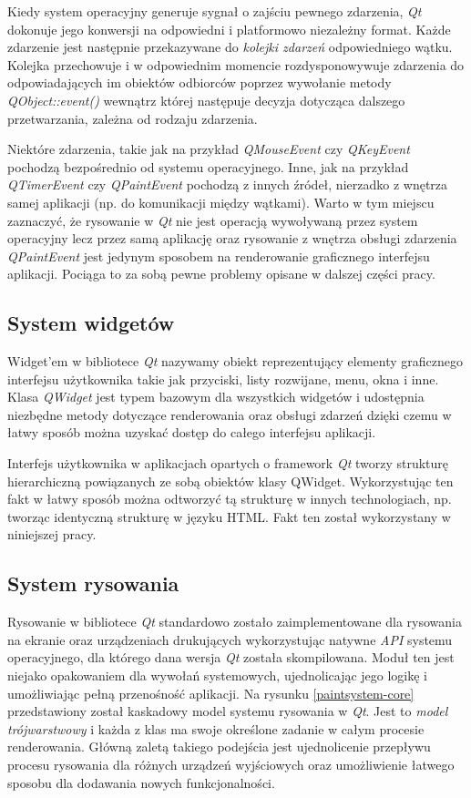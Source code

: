Kiedy system operacyjny generuje sygnał o zajściu pewnego zdarzenia, \emph{Qt} dokonuje jego konwersji na odpowiedni i platformowo niezależny format. Każde zdarzenie jest następnie przekazywane do \emph{kolejki zdarzeń} odpowiedniego wątku. Kolejka przechowuje i w odpowiednim momencie rozdysponowywuje zdarzenia do odpowiadających im obiektów odbiorców poprzez wywołanie metody \emph{QObject::event()} wewnątrz której następuje decyzja dotycząca dalszego przetwarzania, zależna od rodzaju zdarzenia. 

Niektóre zdarzenia, takie jak na przykład \emph{QMouseEvent} czy \emph{QKeyEvent} pochodzą bezpośrednio od systemu operacyjnego. Inne, jak na przykład \emph{QTimerEvent} czy \emph{QPaintEvent} pochodzą z innych źródeł, nierzadko z wnętrza samej aplikacji (np. do komunikacji między wątkami). Warto w tym miejscu zaznaczyć, że rysowanie w \emph{Qt} nie jest operacją wywoływaną przez system operacyjny lecz przez samą aplikację oraz rysowanie z wnętrza obsługi zdarzenia \emph{QPaintEvent} jest jedynym sposobem na renderowanie graficznego interfejsu aplikacji. Pociąga to za sobą pewne problemy opisane w dalszej części pracy.

\subsection{System widgetów}
Widget'em w bibliotece \emph{Qt} nazywamy obiekt reprezentujący elementy graficznego interfejsu użytkownika takie jak przyciski, listy rozwijane, menu, okna i inne. Klasa \emph{QWidget}\cite{qwidget} jest typem bazowym dla wszystkich widgetów i udostępnia niezbędne metody dotyczące renderowania oraz obsługi zdarzeń dzięki czemu w łatwy sposób można uzyskać dostęp do całego interfejsu aplikacji.

Interfejs użytkownika w aplikacjach opartych o framework \emph{Qt} tworzy strukturę hierarchiczną powiązanych ze sobą obiektów klasy QWidget. Wykorzystując ten fakt w łatwy sposób można odtworzyć tą strukturę w innych technologiach, np. tworząc identyczną strukturę w języku HTML. Fakt ten został wykorzystany w niniejszej pracy.

\subsection{System rysowania}
\label{system_rysowania}
Rysowanie w bibliotece \emph{Qt} standardowo zostało zaimplementowane dla rysowania na ekranie oraz urządzeniach drukujących wykorzystując natywne \emph{API} systemu operacyjnego, dla którego dana wersja \emph{Qt} została skompilowana. Moduł ten jest niejako opakowaniem dla wywołań systemowych, ujednolicając jego logikę i umożliwiając pełną przenośność aplikacji. Na rysunku \ref{paintsystem-core} przedstawiony został kaskadowy model systemu rysowania w \emph{Qt}. Jest to \emph{model trójwarstwowy} i każda z klas ma swoje określone zadanie w całym procesie renderowania. Główną zaletą takiego podejścia jest ujednolicenie przepływu procesu rysowania dla różnych urządzeń wyjściowych oraz umożliwienie łatwego sposobu dla dodawania nowych funkcjonalności.

